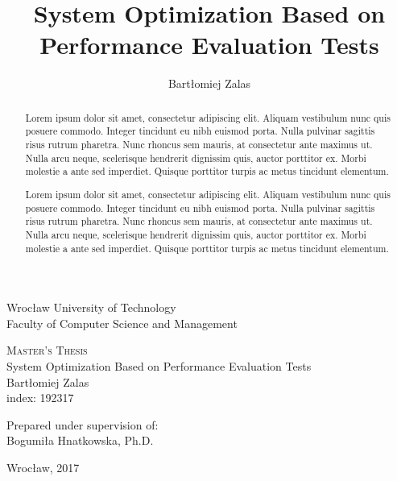 \documentclass[12pt,a4paper]{article}
\author{Bartłomiej Zalas}
\title{System Optimization Based on Performance Evaluation Tests}
\begin{document}
\begin{titlepage}
\begin{center}


\LARGE Wrocław University of Technology\\
\large Faculty of Computer Science and Management\\[7cm]

\begin{center}
\textsc{\huge Master's Thesis}\\
\LARGE System Optimization Based on Performance Evaluation Tests \\[1.0cm]
\large Bartłomiej Zalas\\index: 192317\\[3cm]
\end{center}

\begin{flushright} 
\large Prepared under supervision of:\\Bogumiła Hnatkowska, Ph.D.
\end{flushright}


\vfill

{\large Wrocław, 2017}

\end{center}
\end{titlepage}


\pagebreak
        
\tableofcontents

\pagebreak

{\renewcommand{\abstractname}{Streszczenie}
\begin{abstract}
Lorem ipsum dolor sit amet, consectetur adipiscing elit. Aliquam vestibulum nunc quis posuere commodo. Integer tincidunt eu nibh euismod porta. Nulla pulvinar sagittis risus rutrum pharetra. Nunc rhoncus sem mauris, at consectetur ante maximus ut. Nulla arcu neque, scelerisque hendrerit dignissim quis, auctor porttitor ex. Morbi molestie a ante sed imperdiet. Quisque porttitor turpis ac metus tincidunt elementum.
\end{abstract}}


\begin{abstract}
Lorem ipsum dolor sit amet, consectetur adipiscing elit. Aliquam vestibulum nunc quis posuere commodo. Integer tincidunt eu nibh euismod porta. Nulla pulvinar sagittis risus rutrum pharetra. Nunc rhoncus sem mauris, at consectetur ante maximus ut. Nulla arcu neque, scelerisque hendrerit dignissim quis, auctor porttitor ex. Morbi molestie a ante sed imperdiet. Quisque porttitor turpis ac metus tincidunt elementum.
\end{abstract}
\pagebreak
\end{document}
